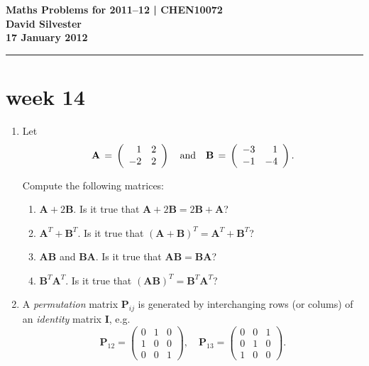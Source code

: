\documentclass[11pt,a4paper]{article}
\def\bA{\mathbf{A}}
\def\bB{\mathbf{B}}
\def\bI{\mathbf{I}}
\def\bP{\mathbf{P}}
\begin{document}
\begin{center} 
{\bf Maths Problems for 2011--12 | CHEN10072 \\
David Silvester \\
17 January 2012}
\end{center}

\hrule
\smallskip
\section*{week 14}

\begin{enumerate}

\item\label{q1167} Let
\[ \bA \,=\, \left( \begin{array}{rr} 1 &2 \\ -2 &2 \end{array} \right) \quad
\hbox{and} \quad
\bB \,=\, \left( \begin{array}{rr} -3 &1 \\ -1 &-4 \end{array} \right).\]

Compute the following matrices:
	\begin{enumerate}
	\item $\bA+ 2\bB$.  Is it true that $ \bA + 2\bB= 2\bB + \bA$?
	\item $\bA^T+  \bB^T$. Is it true that $( \bA + \bB)^T = \bA^T + \bB^T$?
	\item $\bA \bB$ and $\bB \bA$.    Is it true that $ \bA \bB= \bB \bA$?
	\item $\bB^T \bA^T$.  Is it true that $(\bA \bB)^T= \bB^T \bA^T$?
	\end{enumerate}

%

\item\label{qdjsp1}
A {\it permutation} matrix  $\bP_{ij}$ is generated by interchanging rows (or colums) 
of an {\it identity} matrix $\bI$, e.g.
$$  \bP_{12} =  \left ( \begin{array}{ccc}  0 & 1 & 0\\  1 & 0 & 0\\  0 & 0 & 1 \end{array} \right ),  \quad
  \bP_{13} =  \left ( \begin{array}{ccc}  0 & 0 & 1\\  0 & 1 & 0\\  1 & 0 & 0 \end{array} \right ).  $$


\end{enumerate}
\end{document}
